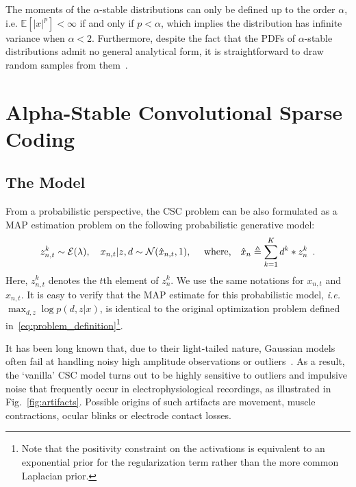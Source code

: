 The moments of the $\alpha$-stable distributions can only be defined up to the order $\alpha$, i.e. $\mathds{E}[|x|^p] < \infty $ if and only if $p <\alpha$, which implies the distribution has infinite variance when $\alpha<2$. Furthermore, despite the fact that the \acp{PDF} of $\alpha$-stable distributions admit no general analytical form, it is straightforward to draw random samples from them~\citep{chambers1976method}.





\section{Alpha-Stable Convolutional Sparse Coding}

\subsection{The Model}


From a probabilistic perspective, the \ac{CSC} problem can be also formulated as a \ac{MAP} estimation problem on the following probabilistic generative model:
%
\begin{align}
z_{n,t}^k \sim {\cal E}(\lambda),
\quad x_{n,t} | z, d \sim {\cal N}( \hat{x}_{n,t},1 ),
\quad \text{ where,}
\quad \hat{x}_n \triangleq \sum_{k=1}^{K}d^{k} * z_{n}^{k} \enspace .
\label{eqn:csc_prob}
\end{align}
%
Here, $z_{n,t}^k$ denotes the $t$th element of $z_{n}^k$. We use the same notations for $x_{n,t}$ and $\hat{x}_{n,t}$. It is easy to verify that the MAP estimate for this probabilistic model, \textit{i.e.}\ $\max_{d,z} \log p(d,z|x)$, is identical to the original optimization problem defined in~\eqref{eq:problem_definition}\footnote{Note that the positivity constraint on the activations is equivalent to an exponential prior for the regularization term rather than the more common Laplacian prior.}.

It has been long known that, due to their light-tailed nature, Gaussian models often fail at handling noisy high amplitude observations or outliers~\citep{Huber81a}. As a result, the `vanilla' \ac{CSC} model turns out to be highly sensitive to outliers and impulsive noise that frequently occur in electrophysiological recordings, as illustrated in Fig.~\ref{fig:artifacts}. Possible origins of such artifacts are movement, muscle contractions, ocular blinks or electrode contact losses.


